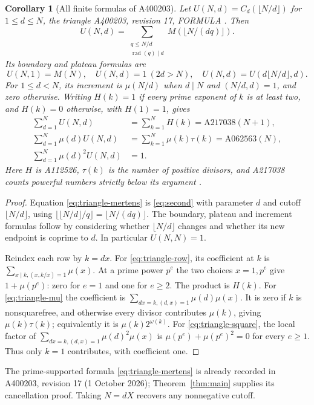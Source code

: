 \documentclass[11pt]{article}
\newtheorem{corollary}[theorem]{Corollary}
\newcommand{\mob}{\mu}
\newcommand{\rad}{\operatorname{rad}}
\newcommand{\C}{C}
\begin{document}
\begin{corollary}[All finite formulas of A400203]\label{cor:triangle}
Let $U(N,d)=\C_d(\lfloor N/d\rfloor)$ for $1\leq d\leq N$,
the triangle A400203, revision 17, FORMULA \cite{a400203}.
Then
\begin{equation}\label{eq:triangle-mertens}
 U(N,d)=\sum_{\substack{q\leq N/d\\\rad(q)\mid d}}
                  M(\lfloor N/(dq)\rfloor).
\end{equation}
Its boundary and plateau formulas are
\[
 U(N,1)=M(N),\quad U(N,d)=1\ (2d>N),\quad
 U(N,d)=U(d\lfloor N/d\rfloor,d).
\]
For $1\leq d<N$, its increment is $\mob(N/d)$ when
$d\mid N$ and $(N/d,d)=1$, and zero otherwise.
Writing $H(k)=1$ if every prime exponent of $k$ is at least two,
and $H(k)=0$ otherwise, with $H(1)=1$, gives
\begin{align}
 \sum_{d=1}^{N}U(N,d)&=\sum_{k=1}^{N}H(k)
                         =\mathrm{A217038}(N+1),\label{eq:triangle-row}\\
 \sum_{d=1}^{N}\mob(d)U(N,d)&=\sum_{k=1}^{N}\mob(k)\tau(k)
                         =\mathrm{A062563}(N),\label{eq:triangle-mu}\\
 \sum_{d=1}^{N}\mob(d)^2U(N,d)&=1.\label{eq:triangle-square}
\end{align}
Here $H$ is A112526, $\tau(k)$ is the number of positive divisors,
and A217038 counts powerful numbers strictly below its argument
\cite{triangle-aux}.
\end{corollary}
\begin{proof}
Equation \eqref{eq:triangle-mertens} is \eqref{eq:second} with parameter
$d$ and cutoff $\lfloor N/d\rfloor$, using
$\lfloor\lfloor N/d\rfloor/q\rfloor=\lfloor N/(dq)\rfloor$.
The boundary, plateau and increment formulas follow by considering
whether $\lfloor N/d\rfloor$ changes and whether its new endpoint is
coprime to $d$. In particular $U(N,N)=1$.

Reindex each row by $k=dx$. For \eqref{eq:triangle-row}, its coefficient
at $k$ is $\sum_{x\mid k,(x,k/x)=1}\mob(x)$. At a prime power $p^e$
the two choices $x=1,p^e$ give $1+\mob(p^e)$: zero for $e=1$ and
one for $e\geq2$. The product is $H(k)$.
For \eqref{eq:triangle-mu} the coefficient is
$\sum_{dx=k,(d,x)=1}\mob(d)\mob(x)$. It is zero if $k$ is
nonsquarefree, and otherwise every divisor contributes $\mob(k)$,
giving $\mob(k)\tau(k)$; equivalently it is $\mob(k)2^{\omega(k)}$.
For \eqref{eq:triangle-square}, the local factor of
$\sum_{dx=k,(d,x)=1}\mob(d)^2\mob(x)$ is
$\mob(p^e)+\mob(p^e)^2=0$ for every $e\geq1$.
Thus only $k=1$ contributes, with coefficient one.
\end{proof}
The prime-supported formula \eqref{eq:triangle-mertens} is already recorded
in A400203, revision 17 (1 October 2026); Theorem~\ref{thm:main} supplies
its cancellation proof. Taking $N=dX$ recovers any nonnegative cutoff.
\end{document}
